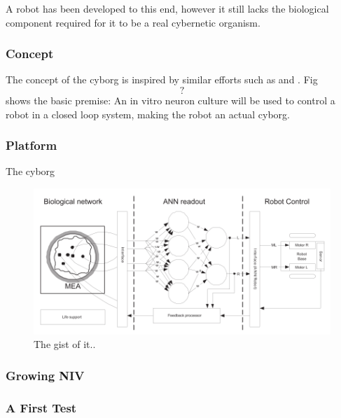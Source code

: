 A robot has been developed to this end, however it still lacks the biological
component required for it to be a real cybernetic organism.
\subsubsection{Concept}
The concept of the cyborg is inspired by similar efforts such as
\cite{li_application_2015} and \cite{warwick paper}.
Fig \[?\] shows the basic premise: An in vitro neuron culture will be used to
control a robot in a closed loop system, making the robot an actual cyborg.
\subsubsection{Platform}
The cyborg 
\begin{figure}[h!]
    \includegraphics[width=\linewidth]{images/cyborg_overview.png}
    \caption{The gist of it..}
    \label{fig:cyborg_idea}
\end{figure}
\subsubsection{Growing NIV}
\subsubsection{A First Test}

